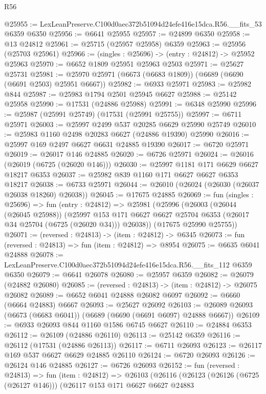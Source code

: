 \begin{lexlean}{R56}
\begin{coremodule}
@25955 := LexLeanPreserve.C100d0aec372b51094d24efe416e15dca.R56.__fits_53 @6359 @6350
@25956 := @6641 @25955
@25957 := @24899 @6350
@25958 := @13 @24812
@25961 := @25715 (@25957 @25958) @6359
@25963 := @25956 (@25703 @25961)
@25966 := (singles : @25696) -> (entry : @24812) -> @25952 @25963
@25970 := @6652 @1809 @25951 @25963 @2503
@25971 := @25627 @25731
@25981 := @25970 @25971 (@6673 (@6683 @1809)) (@6689 (@6690 (@6691 @2503) @25951 @6667))
@25982 := @6933 @25971
@25983 := @25982 @844
@25987 := @25983 @1794 @2501 @25945 @6627
@25988 := @25142 @25958
@25990 := @17531 (@24886 @25988)
@25991 := @6348 @25990
@25996 := @25987 (@25991 @25749) (@17531 (@25991 @25755))
@25997 := @6711 @25971
@26003 := @25997 @2499 @537 @20285 @6629 @25990 @25749
@26010 := @25983 @1160 @2498 @20283 @6627 (@24886 @19390) @25990
@26016 := @25997 @169 @2497 @6627 @6631 @24885 @19390
@26017 := @6720 @25971
@26019 := @26017 @146 @24885
@26020 := @6726 @25971
@26024 := @26016 (@26019 (@6725 (@26020 @146)))
@26030 := @25997 @1181 @171 @6629 @6627 @18217 @6353
@26037 := @25982 @839 @1160 @171 @6627 @6627 @6353 @18217
@26038 := @6733 @25971
@26044 := @26010 (@26024 (@26030 (@26037 @26038 @18260) @26038))
@26045 := @17675 @24885
@26069 := fun (singles : @25696) =>
  fun (entry : @24812) =>
  @25981
    (@25996
      (@26003
        (@26044 (@26045 @25988))
        (@25997 @153 @171 @6627 @6627 @25704 @6353 (@26017 @34 @25704 (@6725 (@26020 @34))) @26038))
      (@17675 @25990 @25755))
@26071 := (reversed : @24813) -> (item : @24812) -> @6345
@26073 := fun (reversed : @24813) => fun (item : @24812) => @8954
@26075 := @6635 @6041 @24888
@26078 := LexLeanPreserve.C100d0aec372b51094d24efe416e15dca.R56.__fits_112 @6359 @6350
@26079 := @6641 @26078
@26080 := @25957 @6359
@26082 := @26079 (@24882 @26080)
@26085 := (reversed : @24813) -> (item : @24812) -> @26075 @26082
@26089 := @6652 @6041 @24888 @26082 @6097
@26092 := @6660 (@6664 @24883) @6667
@26093 := @25627 @26092
@26103 := @26089 @26093 (@6673 (@6683 @6041)) (@6689 (@6690 (@6691 @6097) @24888 @6667))
@26109 := @6933 @26093 @844 @1160 @1586 @6745 @6627
@26110 := @24884 @6353
@26112 := @26109 (@24886 @26110)
@26113 := @25142 @6359
@26116 := @26112 (@17531 (@24886 @26113))
@26117 := @6711 @26093
@26123 := @26117 @169 @537 @6627 @6629 @24885 @26110
@26124 := @6720 @26093
@26126 := @26124 @146 @24885
@26127 := @6726 @26093
@26152 := fun (reversed : @24813) =>
  fun (item : @24812) =>
  @26103
    (@26116
      (@26123
        (@26126 (@6725 (@26127 @146)))
        (@26117
          @153
          @171
          @6627
          @6627
          @24883

\end{coremodule}
\end{lexlean}
